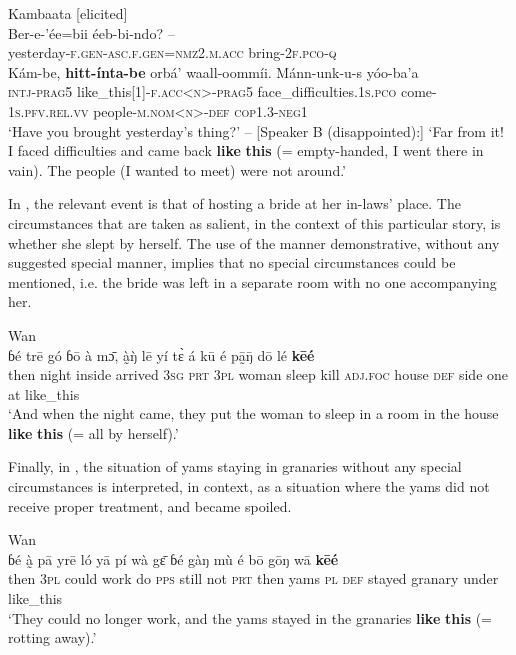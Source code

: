 \documentclass[output=paper,colorlinks,citecolor=brown]{langscibook}
\begin{document}
\ea\label{ex:nikitina:9} {Kambaata [elicited]}\\
\gll Ber-e-’ée=bii éeb-bi-ndo? – \\
     yesterday-\textsc{f.gen-asc.f.gen=nmz2.m.acc} bring-\textsc{2f.pco-q}\\
\gll Kám-be, \textbf{hitt-ínta-be} orbá’ waall-oommíi. Mánn-unk-u-s yóo-ba’a\\
     \textsc{intj-prag5} like\_this[1]-\textsc{f.acc<n>}{}-\textsc{prag5} face\_difficulties.\textsc{1s.pco} come-\textsc{1s.pfv.rel.vv} people-\textsc{m.nom<n>-def} \textsc{cop1.3-neg1}\\
\glt [Speaker A:] ‘Have you brought yesterday’s thing?’ – [Speaker B (disappointed):] ‘Far from it! I faced difficulties and came back \textbf{like} \textbf{this} (= empty-handed, I went there in vain). The people (I wanted to meet) were not around.’ 
\z

In , the relevant event is that of hosting a bride at her in-laws’ place. The circumstances that are taken as salient, in the context of this particular story, is whether she slept by herself. The use of the manner demonstrative, without any suggested special manner, implies that no special circumstances could be mentioned, i.e. the bride was left in a separate room with no one accompanying her.

\ea\label{ex:nikitina:10} {Wan}\\
\gll ɓé trē gó ɓō à m\={ɔ}, à̰\`{ŋ} lē yí t\`{ɛ} á kū é pā̰\={ŋ} dō lé \textbf{kēé}\\
     then night inside arrived \textsc{3sg} \textsc{prt} \textsc{3pl} woman sleep kill \textsc{adj.foc} house \textsc{def} side one at like\_this\\
\glt ‘And when the night came, they put the woman to sleep in a room in the house \textbf{like} \textbf{this} (= all by herself).’
\z

Finally, in , the situation of yams staying in granaries without any special circumstances is interpreted, in context, as a situation where the yams did not receive proper treatment, and became spoiled.

\ea\label{ex:nikitina:11} {Wan}\\
\gll ɓé à̰ pā yrē ló yā pí wà g\={ɛ} ɓé gàŋ mù é bō gōŋ wā \textbf{kēé} \\
     then \textsc{3pl} could work do \textsc{pps} still not \textsc{prt} then yams \textsc{pl} \textsc{def} stayed granary under like\_this\\
\glt ‘They could no longer work, and the yams stayed in the granaries \textbf{like} \textbf{this} (= rotting away).’
\z
\end{document}
